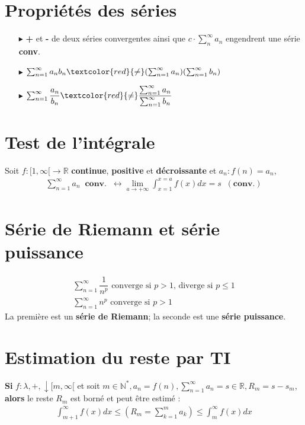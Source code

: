 \documentclass{report}
\begin{document}
\begin{multicols*}{3}
\begin{itemize}
    \end{itemize}



    \section{Propriétés des séries}
    \begin{itemize}
        \item[$\blacktriangleright$]  \textbf{+} et \textbf{-} de deux séries convergentes 
            ainsi que $c \cdot \sum_{n}^{\infty }a_n$ engendrent une série \textbf{conv}.
        \item[$\blacktriangleright$] 
            $\sum_{n=1}^{\infty }a_nb_n \textcolor{red}{\neq} 
            (\sum_{n=1}^{\infty }a_n)(\sum_{n=1}^{\infty}b_n)$
        \item[$\blacktriangleright$]
            $\sum_{n=1}^{\infty }\dfrac{a_n}{b_n} 
            \textcolor{red}{\neq} 
            \dfrac{\sum_{n=1}^{\infty }a_n}{\sum_{n=1}^{\infty }b_n}$
    \end{itemize}
    
    
    \section{Test de l'intégrale}
    Soit $f : [1, \infty [ \rightarrow  \mathbb{R}$ 
    \textbf{continue}, \textbf{positive} et \textbf{décroissante} 
    et $a_n : f(n) = a_n$,
    \begin{align*}
        \sum_{n=1}^{\infty }a_n \;\; \textbf{conv.} \;\; \leftrightarrow
        \lim\limits_{a \to +\infty }\int_{x=1}^{x = a}f(x)dx = s \;\; (\textbf{conv.})    
    \end{align*}


    \section{Série de Riemann et série puissance} 
    \begin{align*}
        \sum_{n=1}^{\infty }\dfrac{1}{n^p} 
        \text{ converge si } p > 1 \text{, diverge si } p \leq 1
        \\
        \sum_{n=1}^{\infty }n^p \text{ converge  si }
         p > 1 
    \end{align*}
    La première est un \textbf{série de Riemann}; la seconde 
    est une \textbf{série puissance}.  


    
    \section{Estimation du reste par TI}
    \textbf{Si} $f: \lambda, + , \downarrow [m, \infty [$ et soit $m \in \mathbb{N}^*, 
     a_n = f(n), \sum_{n=1}^{\infty }a_n = s \in \mathbb{R}, 
     R_m = s - s_m$, \textbf{alors} le reste $R_m$ est borné et peut être 
     estimé :
     \begin{align*}
        \int_{m+1}^{\infty }f(x)dx \leq \left(R_m = \sum_{k=1}^{m} a_k\right) 
        \leq \int_{m}^{\infty }f(x)dx
     \end{align*}



\end{multicols*}
\end{document}
